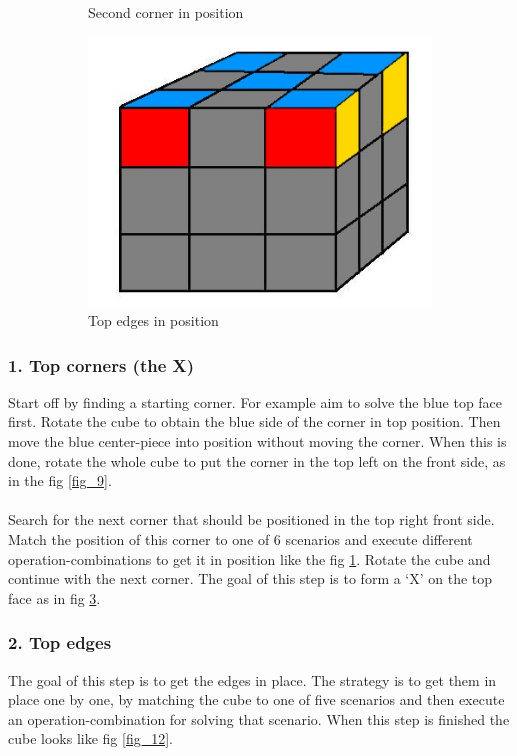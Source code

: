 \documentclass[a4paper,11pt]{kth-mag}
\begin{document}
\begin{figure}[b]
\begin{subfigure}[!b]{0.3\textwidth}
		\caption{Second corner in position}
		\label{fig_10}
	\end{subfigure}
	\begin{subfigure}[!b]{0.3\textwidth}
		\includegraphics[width=\textwidth]{figs/rubiks-4-corners.jpg}
		\caption{Top edges in position}
		\label{fig_11}
	\end{subfigure}
	\caption{}
\end{figure}

\subsubsection{1. Top corners (the X)}
Start off by finding a starting corner. For example aim to solve the blue top face first. Rotate the cube to obtain the blue side of the corner in top position. Then move the blue center-piece into position without moving the corner. When this is done, rotate the whole cube to put the corner in the top left on the front side, as in the fig \ref{fig_9}.\\\\
Search for the next corner that should be positioned in the top right front side. Match the position of this corner to one of 6 scenarios and execute different operation-combinations to get it in position like the fig \ref{fig_10}. Rotate the cube and continue with the next corner. The goal of this step is to form a ‘X’ on the top face as in fig \ref{fig_11}.
\subsubsection{2. Top edges}
The goal of this step is to get the edges in place. The strategy is to get them in place one by one, by matching the cube to one of five scenarios and then execute an operation-combination for solving that scenario. When this step is finished the cube looks like fig \ref{fig_12}.
\end{document}
